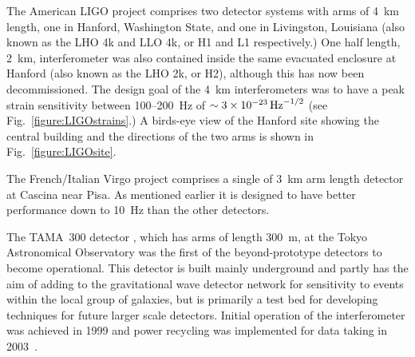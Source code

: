 \documentclass{article}
\begin{document}
The American LIGO project \cite{LIGOweb} comprises two detector
systems with arms of 4~km length, one in Hanford, Washington State, and one in
Livingston, Louisiana (also known as the LHO 4k and LLO 4k, or H1 and L1
respectively.) One half length, 2~km, interferometer was also contained inside
the same evacuated enclosure at Hanford (also known as the LHO 2k, or H2), 
although this has now been decommissioned. The
design goal of the 4~km interferometers was to have a peak strain sensitivity
between 100--200~Hz of $\sim 3\times10^{-23}\,{\rm Hz}^{-1/2}$ \cite{LIGOSRD}
(see Fig.~\ref{figure:LIGOstrains}.) A birds-eye view of the Hanford site
showing the central building and the directions of the two arms is shown in
Fig.~\ref{figure:LIGOsite}.


The French/Italian Virgo project \cite{Virgoweb} comprises a single of 3~km arm
length detector at Cascina near Pisa. As mentioned earlier it is designed to
have better performance down to 10~Hz than the other detectors.

The TAMA~300 detector \cite{TAMAweb}, which has arms of length 300~m, at the
Tokyo Astronomical Observatory was the first of the beyond-prototype detectors
to become operational. This detector is built mainly underground and partly has
the aim of adding to the gravitational wave detector network for sensitivity to
events within the local group of galaxies, but is primarily a test bed for developing
techniques for future larger scale detectors. Initial operation of the
interferometer was achieved in 1999 and power recycling was implemented for data
taking in 2003~\cite{Arai:2003}.
\end{document}

